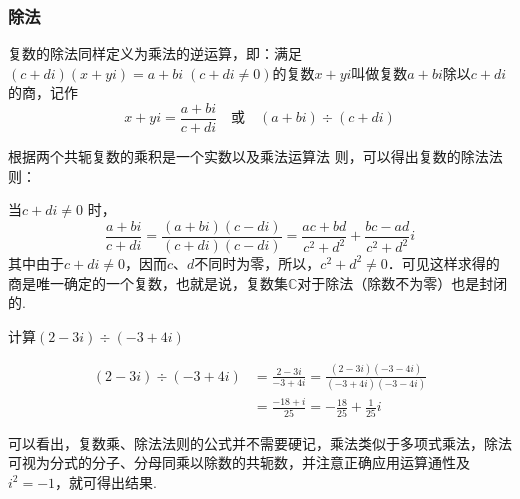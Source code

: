 \subsubsection{除法}

复数的除法同样定义为乘法的逆运算，即：满足$(c+di)(x+yi)=a+bi\; (c+di\neq0)$的复数$x+yi$叫做复数$a+bi$除以$c+di$的商，记作
$$x+yi=\frac{a+bi}{c+di}\quad \text{或}\quad( a+bi )\div( c+di ) $$

根据两个共轭复数的乘积是一个实数以及乘法运算法
则，可以得出复数的除法法则：

当$c+ di\neq 0$ 时，
\[\frac{a+bi}{c+di}=\frac{(a+bi)(c-di)}{(c+di)(c-di)}=\frac{ac+bd}{c^2+d^2}+\frac{bc-ad}{c^2+d^2}i\]
其中由于$c+di\ne 0$，因而$c$、$d$不同时为零，所以，$c^2+d^2\ne 0$．可见这样求得的商是唯一确定的一个复数，也就是说，复数集$\mathbb{C}$对于除法（除数不为零）也是封闭的.

\begin{example}
    计算$(2-3i)\div (-3+4i)$
\end{example}

\begin{solution}
\[\begin{split}
    (2-3i)\div (-3+4i)&=\frac{2-3i}{-3+4i}=\frac{(2-3i)(-3-4i)}{(-3+4i)(-3-4i)}\\
    &=\frac{-18+i}{25}=-\frac{18}{25}+\frac{1}{25}i
\end{split}\]
\end{solution}

可以看出，复数乘、除法法则的公式并不需要硬记，乘法类似于多项式乘法，除法可视为分式的分子、分母同乘以除数的共轭数，并注意正确应用运算通性及$i^2=-1$，就可得出结果.

